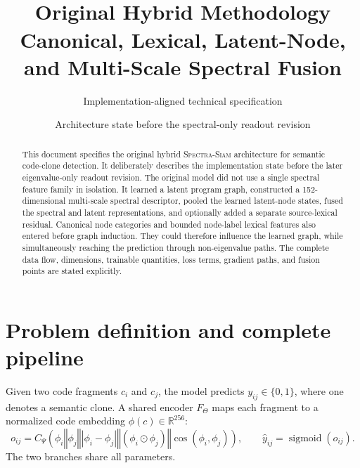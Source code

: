 \documentclass[11pt,a4paper]{article}
\title{\vspace{-12mm}\method{}\\[2mm]
\Large Original Hybrid Methodology\\[1mm]
\large Canonical, Lexical, Latent-Node, and Multi-Scale Spectral Fusion}
\author{Implementation-aligned technical specification}
\date{Architecture state before the spectral-only readout revision}
\newcommand{\method}{\textsc{Spectra-Siam}}
\newcommand{\R}{\mathbb{R}}
\newcommand{\concat}{\mathbin{\Vert}}
\newcommand{\sigmoid}{\operatorname{sigmoid}}
\begin{document}
\maketitle
\thispagestyle{empty}

\begin{abstract}
This document specifies the original hybrid \method{} architecture for semantic
code-clone detection. It deliberately describes the implementation state before
the later eigenvalue-only readout revision. The original model did not use a
single spectral feature family in isolation. It learned a latent program graph,
constructed a 152-dimensional multi-scale spectral descriptor, pooled the learned
latent-node states, fused the spectral and latent representations, and optionally
added a separate source-lexical residual. Canonical node categories and bounded
node-label lexical features also entered before graph induction. They could
therefore influence the learned graph, while simultaneously reaching the
prediction through non-eigenvalue paths. The complete data flow, dimensions,
trainable quantities, loss terms, gradient paths, and fusion points are stated
explicitly.
\end{abstract}

\begin{center}
\end{center}

\tableofcontents
\clearpage

\section{Problem definition and complete pipeline}

Given two code fragments $c_i$ and $c_j$, the model predicts
$y_{ij}\in\{0,1\}$, where one denotes a semantic clone. A shared encoder
$F_\Theta$ maps each fragment to a normalized code embedding
$\phi(c)\in\R^{256}$:
\begin{equation}
o_{ij}=C_\Psi\!\left(
\phi_i\concat\phi_j\concat|\phi_i-\phi_j|
\concat(\phi_i\odot\phi_j)\concat\cos(\phi_i,\phi_j)
\right),
\qquad
\widehat y_{ij}=\sigmoid(o_{ij}).
\end{equation}
The two branches share all parameters.
\end{document}
